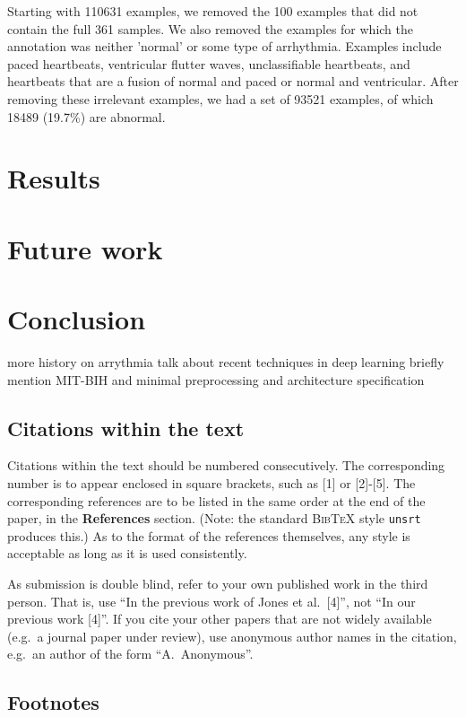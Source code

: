 \documentclass{article} %
\begin{document}
Starting with 110631 examples, we removed the 100 examples that did not contain the full 361 samples. We also removed the examples for which the annotation was neither 'normal' or some type of arrhythmia. Examples include paced heartbeats, ventricular flutter waves, unclassifiable heartbeats, and heartbeats that are a fusion of normal and paced or normal and ventricular. After removing these irrelevant examples, we had a set of 93521 examples, of which 18489 (19.7\%) are abnormal.


\section{Results}

\section{Future work}

\section{Conclusion}

more history on arrythmia
talk about recent techniques in deep learning
briefly mention MIT-BIH and minimal preprocessing and architecture specification

\subsection{Citations within the text}

Citations within the text should be numbered consecutively. The corresponding
number is to appear enclosed in square brackets, such as [1] or [2]-[5]. The
corresponding references are to be listed in the same order at the end of the
paper, in the \textbf{References} section. (Note: the standard
\textsc{Bib\TeX} style \texttt{unsrt} produces this.) As to the format of the
references themselves, any style is acceptable as long as it is used
consistently.

As submission is double blind, refer to your own published work in the 
third person. That is, use ``In the previous work of Jones et al.\ [4]'',
not ``In our previous work [4]''. If you cite your other papers that
are not widely available (e.g.\ a journal paper under review), use
anonymous author names in the citation, e.g.\ an author of the
form ``A.\ Anonymous''. 


\subsection{Footnotes}
\end{document}
